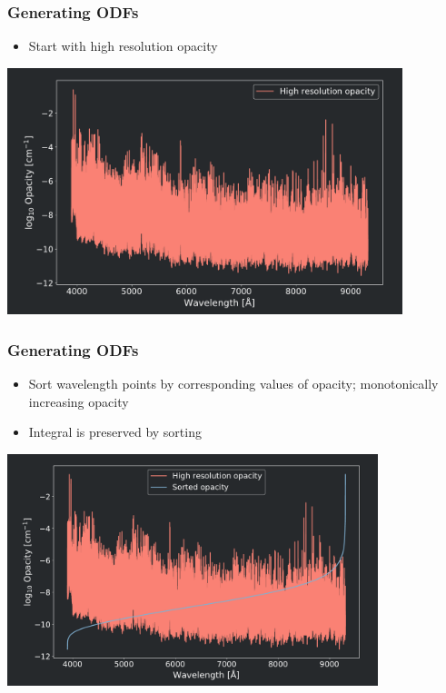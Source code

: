 \frame
{
	\frametitle{Generating ODFs}
	\begin{itemize}
    \item Start with high resolution opacity	
	\end{itemize}

	\centering
	\includegraphics[width=115mm]{images/odf_generation_process_0}
}

\frame
{
	\frametitle{Generating ODFs}
	\begin{itemize}
    \item Sort wavelength points by corresponding values of opacity; monotonically increasing opacity
    \item Integral is preserved by sorting
	\end{itemize}		
	\centering
	\includegraphics[width=108mm]{images/odf_generation_process_1}
}

